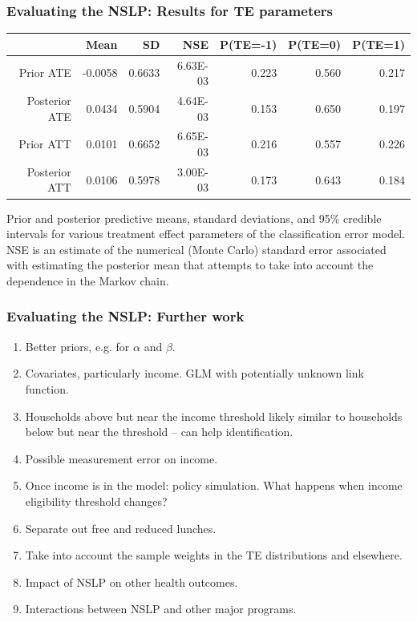 \documentclass[xcolor=dvipsnames]{beamer}
\begin{document}
\begin{frame}[fragile]
\frametitle{Evaluating the NSLP: Results for TE parameters}
  
\begin{table}[ht]
\centering
{\footnotesize
\begin{tabular}{|r|rrr|rrr|}
  \hline
 & Mean & SD & NSE & P(TE=-1) & P(TE=0) & P(TE=1) \\ 
  \hline
Prior ATE & -0.0058 & 0.6633 & 6.63E-03 & 0.223 & 0.560 & 0.217 \\ 
  Posterior ATE & 0.0434 & 0.5904 & 4.64E-03 & 0.153 & 0.650 & 0.197 \\ 
  Prior ATT & 0.0101 & 0.6652 & 6.65E-03 & 0.216 & 0.557 & 0.226 \\ 
  Posterior ATT & 0.0106 & 0.5978 & 3.00E-03 & 0.173 & 0.643 & 0.184 \\ 
   \hline
\end{tabular}
}
\end{table}
{\footnotesize Prior and posterior predictive means, standard deviations, and 95\% credible intervals for various treatment effect parameters of the classification error model. NSE is an estimate of the numerical (Monte Carlo) standard error associated with estimating the posterior mean that attempts to take into account the dependence in the Markov chain.}
\end{frame}



\begin{frame}[fragile]
\frametitle{Evaluating the NSLP: Further work}
  \begin{enumerate}
\item Better priors, e.g. for $\alpha$ and $\beta$.
\item Covariates, particularly income. GLM with potentially unknown link function.
\item Households above but near the income threshold likely similar to households below but near the threshold -- can help identification.
\item Possible measurement error on income.
\item Once income is in the model: policy simulation. What happens when income eligibility threshold changes?
\item Separate out free and reduced lunches.
\item Take into account the sample weights in the TE distributions and elsewhere.
\item Impact of NSLP on other health outcomes.
\item Interactions between NSLP and other major programs.
  \end{enumerate}
  
\end{frame}
\end{document}
